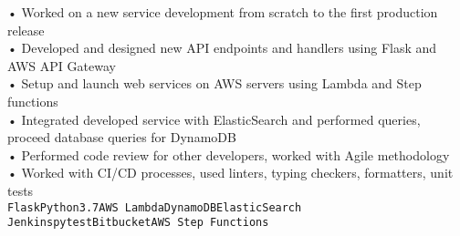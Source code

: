 {\begin{entrylist}
{			• Worked on a new service development from scratch to the first production release \\
            • Developed and designed new API endpoints and handlers using Flask and AWS API Gateway \\
            • Setup and launch web services on AWS servers using Lambda and Step functions \\
            • Integrated developed service with ElasticSearch and performed queries, proceed database queries for DynamoDB \\
            • Performed code review for other developers, worked with Agile methodology \\
            • Worked with CI/CD processes, used linters, typing checkers, formatters, unit tests \\
			\texttt{Flask}\slashsep\texttt{Python3.7}\slashsep\texttt{AWS Lambda}\slashsep\texttt{DynamoDB}\slashsep\texttt{ElasticSearch}\\
			\texttt{Jenkins}\slashsep\texttt{pytest}\slashsep\texttt{Bitbucket}\slashsep\texttt{AWS Step Functions}
		}
	\end{entrylist}
}

\newcommand{\cvtemplateeducation}{Education}
\newcommand{\cveducation}{
	\begin{entrylist}
	    \entry
		{2018}
		{Python course, EPAM Systems}
		{Saint Petersburg}
		{
			Generally I studied Python on EPAM courses. During course, all main Python topics have been learnt
			and put into practice. My final project was written on Python, Flask.
			It was a web service for getting some statistics from external API and displaying it in graphs view.\\
			\texttt{Python3}\slashsep\texttt{Flask}
		}
		\entry
		{2014 – 2020}
		{Bachelor/Master's Degrees in Software Engineering, ITMO University}
		{Saint Petersburg}
		{
			I studied Software Engineering in University. My final project was written on Python, Django.
			It was a web service for saving educational results [certificates] based on Blockchain technology.\\
			\texttt{Python3}\slashsep\texttt{Django}\slashsep\texttt{SQLite}
		}
	\end{entrylist}
}

\newcommand{\cvtemplatecontacts}{Contacts}
\newcommand{\cvcontacts}{
	\icontext{MapMarker}{12}{Montenegro}\\
	\icontext{At}{12}{\href{mailto:valeriiashestakova@gmail.com}{valeriiashestakova@gmail.com}}\\
	\icontext{Github}{12}{\href{https://github.com/lerushe}{@lerushe}}\\
}
\newcommand{\cvtemplatelanguages}{Languages}
\newcommand{\cvlanguages}{
	\bubbles{
    	5/Russian,
    	4/English
	}{}
}
